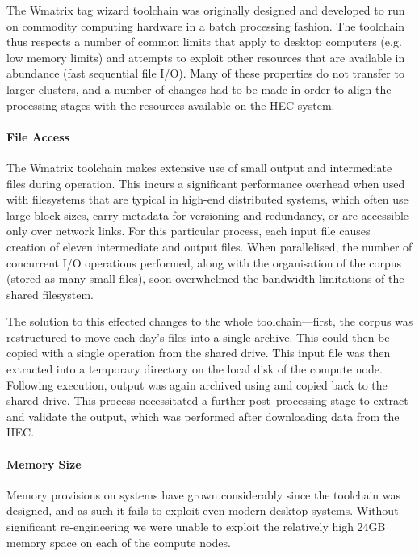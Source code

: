 
The Wmatrix tag wizard toolchain was originally designed and developed to run on commodity computing hardware in a batch processing fashion.  The toolchain thus respects a number of common limits that apply to desktop computers (e.g. low memory limits) and attempts to exploit other resources that are available in abundance (fast sequential file I/O).
Many of these properties do not transfer to larger clusters, and a number of changes had to be made in order to align the processing stages with the resources available on the HEC system.


\paragraph{File Access}
The Wmatrix toolchain makes extensive use of small output and intermediate files during operation.  This incurs a significant performance overhead when used with filesystems that are typical in high-end distributed systems, which often use large block sizes, carry metadata for versioning and redundancy, or are accessible only over network links.
For this particular process, each input file causes creation of eleven intermediate and output files.  When parallelised, the number of concurrent I/O operations performed, along with the organisation of the corpus (stored as many small files), soon overwhelmed the bandwidth limitations of the shared filesystem.

The solution to this effected changes to the whole toolchain---first, the corpus was restructured to move each day's files into a single  archive.  This could then be copied with a single operation from the shared drive.
This input file was then extracted into a temporary directory on the local disk of the compute node.
Following execution, output was again archived using  and copied back to the shared drive.  This process necessitated a further post--processing stage to extract and validate the output, which was performed after downloading data from the HEC.


\paragraph{Memory Size}
Memory provisions on systems have grown considerably since the toolchain was designed, and as such it fails to exploit even modern desktop systems. 
Without significant re-engineering we were unable to exploit the relatively high 24GB memory space on each of the compute nodes.




